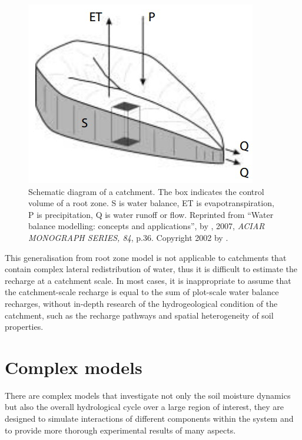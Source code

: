 \begin{figure}[bth]
\begin{center}
\includegraphics[width=0.5\linewidth]{gfx/catchment}
\caption{Schematic diagram of a catchment\citep{Zhang2002}. The box indicates the control volume of a root zone. S is water balance, ET is evapotranspiration, P is precipitation, Q is water runoff or flow. Reprinted from ``Water balance modelling: concepts and applications'', by \citeauthor{Zhang2002}, 2007, \emph{ACIAR MONOGRAPH SERIES, 84}, p.36. Copyright 2002 by \citeauthor{Zhang2002}. }\label{fig:catchment}
\end{center}
\end{figure}
\newline
This generalisation from root zone model is not applicable to catchments that contain complex lateral redistribution of water, thus it is difficult to estimate the recharge at a catchment scale. In most cases, it is inappropriate to assume that the catchment-scale recharge is equal to the sum of plot-scale water balance recharges, without in-depth research of the hydrogeological condition of the catchment, such as the recharge pathways and spatial heterogeneity of soil properties\citep{Zhang2002}.
 
\section{Complex models}
	There are complex models that investigate not only the soil moisture dynamics but also the overall hydrological cycle over a large region of interest, they are designed to simulate interactions of different components within the system and to provide more thorough experimental results of many aspects\citep{Zhang2001}.
